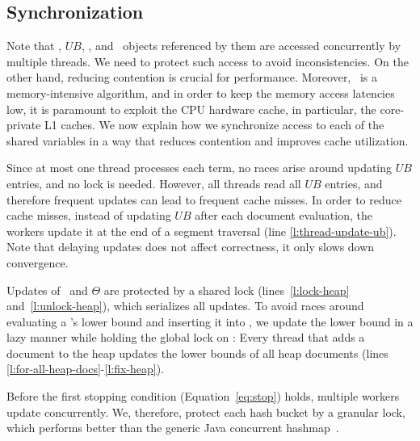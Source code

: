 \subsection{Synchronization} 
\label{sec:synch}

Note that \DHeap, $UB$, \DMap, and \Docobj\ objects referenced by them are accessed concurrently by multiple threads. We need to protect such access to avoid inconsistencies. On the other hand, reducing contention is crucial for performance. Moreover, 
\alg\ is a memory-intensive algorithm, and 
in order to keep the memory access latencies low, it is paramount to exploit the CPU hardware cache, in particular, the core-private L1 caches. 
We now explain how we synchronize access to each of the shared variables
in a way that reduces contention and improves cache utilization. 



Since at most one thread processes each term, no races arise around updating $UB$ entries, and no lock is needed. However, 
all threads read all $UB$ entries, and therefore frequent updates can lead to frequent cache misses.  
In order to reduce cache misses, instead of updating $UB$ after each document evaluation, the workers update it at the end of a segment traversal (line \ref{l:thread-update-ub}). 
Note that delaying updates does not affect correctness, it only slows down convergence.

Updates of \DHeap\ and $\Theta$ are protected by a shared lock (lines~\ref{l:lock-heap} and~\ref{l:unlock-heap}), which  serializes all updates. 
To avoid races around evaluating a \Docobj's
lower bound and inserting it into \DHeap, we update the lower bound in a lazy manner while holding the global lock on \DHeap: Every thread that adds a document to the heap updates the lower bounds of all heap documents (lines \ref{l:for-all-heap-docs}-\ref{l:fix-heap}).

Before the first stopping condition (Equation~\ref{eq:stop}) holds, multiple workers update \DMap\/ concurrently. 
We, therefore, protect each hash bucket by a granular lock, which  
performs better than the generic Java concurrent hashmap~\cite{java-hashmap}.


